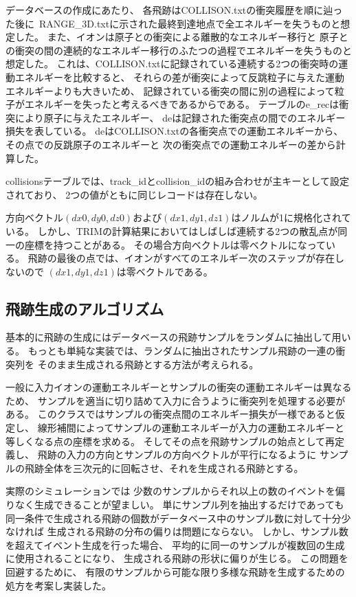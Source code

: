 \documentclass [11pt,a4paper,dvipdfmx] {jarticle}
\begin{document}
データベースの作成にあたり、
各飛跡はCOLLISON.txtの衝突履歴を順に辿った後に\
RANGE\_3D.txtに示された最終到達地点で全エネルギーを失うものと想定した。
また、イオンは原子との衝突による離散的なエネルギー移行と
原子との衝突の間の連続的なエネルギー移行のふたつの過程でエネルギーを失うものと想定した。
これは、COLLISON.txtに記録されている連続する2つの衝突時の運動エネルギーを比較すると、
それらの差が衝突によって反跳粒子に与えた運動エネルギーよりも大きいため、
記録されている衝突の間に別の過程によって粒子がエネルギーを失ったと考えるべきであるからである。
テーブルのe\_recは衝突により原子に与えたエネルギー、
deは記録された衝突点の間でのエネルギー損失を表している。
deはCOLLISON.txtの各衝突点での運動エネルギーから、その点での反跳原子のエネルギーと
次の衝突点での運動エネルギーの差から計算した。

collisionsテーブルでは、track\_idとcollision\_idの組み合わせが主キーとして設定されており、
2つの値がともに同じレコードは存在しない。

方向ベクトル$(dx0, dy0, dz0)$および$(dx1, dy1, dz1)$はノルムが1に規格化されている。
しかし、TRIMの計算結果においてはしばしば連続する2つの散乱点が同一の座標を持つことがある。
その場合方向ベクトルは零ベクトルになっている。
飛跡の最後の点では、イオンがすべてのエネルギー次のステップが存在しないので
$(dx1, dy1, dz1)$は零ベクトルである。

\subsection{飛跡生成のアルゴリズム}
基本的に飛跡の生成にはデータベースの飛跡サンプルをランダムに抽出して用いる。
もっとも単純な実装では、ランダムに抽出されたサンプル飛跡の一連の衝突列を
そのまま生成される飛跡とする方法が考えられる。

一般に入力イオンの運動エネルギーとサンプルの衝突の運動エネルギーは異なるため、
サンプルを適当に切り詰めて入力に合うように衝突列を処理する必要がある。
このクラスではサンプルの衝突点間のエネルギー損失が一様であると仮定し、
線形補間によってサンプルの運動エネルギーが入力の運動エネルギーと等しくなる点の座標を求める。
そしてその点を飛跡サンプルの始点として再定義し、
飛跡の入力の方向とサンプルの方向ベクトルが平行になるように
サンプルの飛跡全体を三次元的に回転させ、それを生成される飛跡とする。


実際のシミュレーションでは
少数のサンプルからそれ以上の数のイベントを偏りなく生成できることが望ましい。
単にサンプル列を抽出するだけであっても
同一条件で生成される飛跡の個数がデータベース中のサンプル数に対して十分少なければ
生成される飛跡の分布の偏りは問題にならない。
しかし、サンプル数を超えてイベント生成を行った場合、
平均的に同一のサンプルが複数回の生成に使用されることになり、
生成される飛跡の形状に偏りが生じる。
この問題を回避するために、
有限のサンプルから可能な限り多様な飛跡を生成するための処方を考案し実装した。
\end{document}
